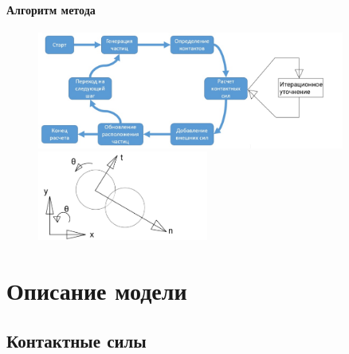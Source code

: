\documentclass[c]{beamer}  %
\begin{document}
\begin{frame}
\frametitle{\insertsection} 
\framesubtitle{Алгоритм метода}

\begin{figure}[h!]
	\centering
	\includegraphics[width=0.9\textwidth]{algorithm}
	\includegraphics[width=0.5\textwidth]{local}
\end{figure} 
\end{frame}


\section{Описание модели}

\subsection{Контактные силы}
\end{document}
